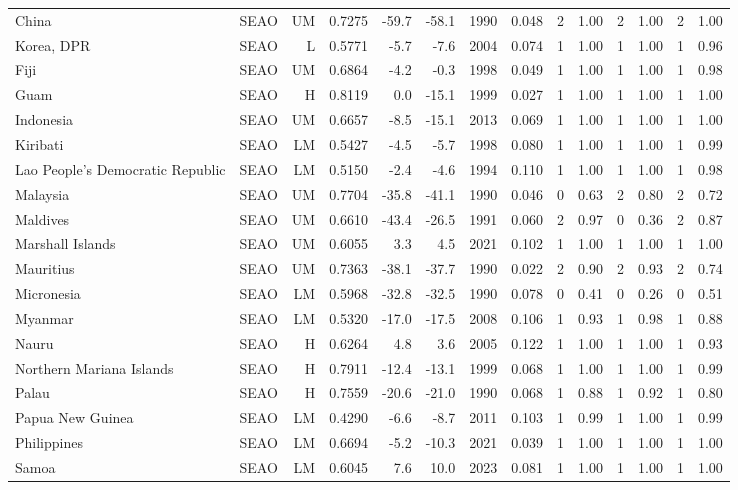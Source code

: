 \begin{longtable}{llrrrrrrrrrrrr}
China & SEAO & UM & 0.7275 & -59.7 & -58.1 & 1990 & 0.048 & 2 & 1.00 & 2 & 1.00 & 2 & 1.00 \\
Korea, DPR & SEAO & L & 0.5771 &  -5.7 &  -7.6 & 2004 & 0.074 & 1 & 1.00 & 1 & 1.00 & 1 & 0.96 \\
Fiji & SEAO & UM & 0.6864 &  -4.2 &  -0.3 & 1998 & 0.049 & 1 & 1.00 & 1 & 1.00 & 1 & 0.98 \\
Guam & SEAO & H & 0.8119 &   0.0 & -15.1 & 1999 & 0.027 & 1 & 1.00 & 1 & 1.00 & 1 & 1.00 \\
Indonesia & SEAO & UM & 0.6657 &  -8.5 & -15.1 & 2013 & 0.069 & 1 & 1.00 & 1 & 1.00 & 1 & 1.00 \\
Kiribati & SEAO & LM & 0.5427 &  -4.5 &  -5.7 & 1998 & 0.080 & 1 & 1.00 & 1 & 1.00 & 1 & 0.99 \\
Lao People's Democratic Republic & SEAO & LM & 0.5150 &  -2.4 &  -4.6 & 1994 & 0.110 & 1 & 1.00 & 1 & 1.00 & 1 & 0.98 \\
Malaysia & SEAO & UM & 0.7704 & -35.8 & -41.1 & 1990 & 0.046 & 0 & 0.63 & 2 & 0.80 & 2 & 0.72 \\
Maldives & SEAO & UM & 0.6610 & -43.4 & -26.5 & 1991 & 0.060 & 2 & 0.97 & 0 & 0.36 & 2 & 0.87 \\
Marshall Islands & SEAO & UM & 0.6055 &   3.3 &   4.5 & 2021 & 0.102 & 1 & 1.00 & 1 & 1.00 & 1 & 1.00 \\
Mauritius & SEAO & UM & 0.7363 & -38.1 & -37.7 & 1990 & 0.022 & 2 & 0.90 & 2 & 0.93 & 2 & 0.74 \\
Micronesia & SEAO & LM & 0.5968 & -32.8 & -32.5 & 1990 & 0.078 & 0 & 0.41 & 0 & 0.26 & 0 & 0.51 \\
Myanmar & SEAO & LM & 0.5320 & -17.0 & -17.5 & 2008 & 0.106 & 1 & 0.93 & 1 & 0.98 & 1 & 0.88 \\
Nauru & SEAO & H & 0.6264 &   4.8 &   3.6 & 2005 & 0.122 & 1 & 1.00 & 1 & 1.00 & 1 & 0.93 \\
Northern Mariana Islands & SEAO & H & 0.7911 & -12.4 & -13.1 & 1999 & 0.068 & 1 & 1.00 & 1 & 1.00 & 1 & 0.99 \\
Palau & SEAO & H & 0.7559 & -20.6 & -21.0 & 1990 & 0.068 & 1 & 0.88 & 1 & 0.92 & 1 & 0.80 \\
Papua New Guinea & SEAO & LM & 0.4290 &  -6.6 &  -8.7 & 2011 & 0.103 & 1 & 0.99 & 1 & 1.00 & 1 & 0.99 \\
Philippines & SEAO & LM & 0.6694 &  -5.2 & -10.3 & 2021 & 0.039 & 1 & 1.00 & 1 & 1.00 & 1 & 1.00 \\
Samoa & SEAO & LM & 0.6045 &   7.6 &  10.0 & 2023 & 0.081 & 1 & 1.00 & 1 & 1.00 & 1 & 1.00 \\

\end{longtable}
